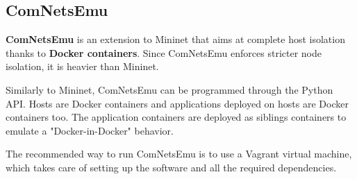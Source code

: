 \subsection{ComNetsEmu}
\label{sec:bg/network/comnetsemu}

\textbf{ComNetsEmu} is an extension to Mininet that aims at complete host isolation thanks to \textbf{Docker containers}. Since ComNetsEmu enforces stricter node isolation, it is heavier than Mininet.

Similarly to Mininet, ComNetsEmu can be programmed through the Python API. Hosts are Docker containers and applications deployed on hosts are Docker containers too. The application containers are deployed as siblings containers to emulate a "Docker-in-Docker" behavior.

The recommended way to run ComNetsEmu is to use a Vagrant virtual machine, which takes care of setting up the software and all the required dependencies.\cite{comnetsemu}
